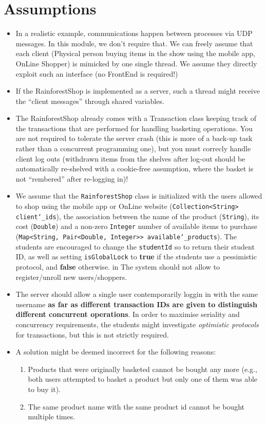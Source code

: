 \documentclass{article}
\begin{document}
	
	\section*{Assumptions}
	\begin{itemize}
		\item In a realistic example, communications happen between processes via UDP messages. In this module, we don't require that. We can freely assume that each client (Physical person buying items in the show using the mobile app, OnLine Shopper) is mimicked by one single
		thread. We assume they directly exploit such an interface (no
		FrontEnd is required!)
		\item  If the RainforestShop is implemented as a server, such a thread might receive the ``client messages'' through shared
		variables. 
		\item The RainforestShop already comes with a Transaction class  keeping track of the transactions
		that are performed for handling basketing operations. You are not required to tolerate the server crash (this is more of
		a back-up task rather than a concurrent programming one), but
		you must correcly handle client log outs (withdrawn items from the shelves after log-out should be automatically re-shelved with a cookie-free assumption, where the basket is not ``rembered'' after re-logging in)!
		\item We assume that the \texttt{RainforestShop} class is initialized with the users allowed to shop using the mobile app or OnLine website  (\texttt{Collection<String> client\char`_ids}), the association between the name of the product (\texttt{String}), its cost (\texttt{Double}) and a non-zero \texttt{Integer} number of available items to purchase (\texttt{Map<String, Pair<Double, Integer>> available\char`_products}). The students are encouraged to change the \texttt{studentId} so to return their student ID, as well as setting \texttt{isGlobalLock} to \textbf{true} if the students use a pessimistic protocol, and \textbf{false} otherwise. in The system should not allow to register/unroll new users/shoppers. 
		\item The server should allow a single user contemporarily loggin in with the same username \textbf{as far as different transaction IDs are given to distinguish different concurrent operations}. In order to maximise seriality and concurrency requirements, the students might investigate \textit{optimistic protocols} for transactions, but this is not strictly required.
		\item A solution might be deemed incorrect for the following reasons:
		\begin{enumerate}
		\item Products that were originally basketed cannot be bought any more (e.g., both users attempted to basket a product but only one of them was able to buy it).
	\item The same product name with the same product id cannot be bought multiple times.


\end{enumerate}
\end{itemize}
\end{document}
